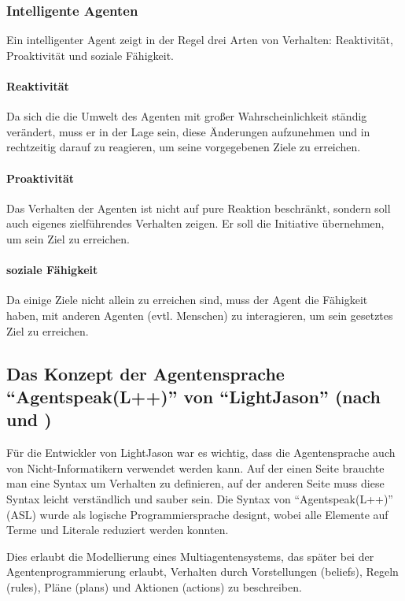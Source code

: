\subsubsection{Intelligente Agenten}

Ein intelligenter Agent zeigt in der Regel drei Arten von Verhalten: Reaktivität, Proaktivität und soziale Fähigkeit.

\paragraph*{Reaktivität} 
Da sich die die Umwelt des Agenten  mit großer Wahrscheinlichkeit ständig verändert, muss er in der Lage sein, diese Änderungen aufzunehmen und in rechtzeitig darauf zu reagieren, um seine vorgegebenen Ziele zu erreichen.

\paragraph*{Proaktivität} 
Das Verhalten der Agenten ist nicht auf pure Reaktion beschränkt, sondern soll auch eigenes zielführendes Verhalten zeigen. 
Er soll die Initiative übernehmen, um sein Ziel zu erreichen.

\paragraph*{soziale Fähigkeit} 
Da einige Ziele nicht allein zu erreichen sind, muss der Agent die Fähigkeit haben, mit anderen Agenten (evtl. Menschen) zu interagieren, um sein gesetztes Ziel zu erreichen.


\subsection{Das Konzept der Agentensprache \enquote{Agentspeak(L++)} von \enquote{LightJason} (nach \cite{lightjason} und \cite{lightjason-web})}
\label{sec:agentspeak}

Für die Entwickler von LightJason war es wichtig, dass die Agentensprache auch von Nicht-Informatikern verwendet werden kann.
Auf der einen Seite brauchte man eine Syntax um Verhalten zu definieren, auf der anderen Seite muss diese Syntax leicht verständlich und sauber sein.
Die Syntax von \enquote{Agentspeak(L++)} (ASL) wurde als logische Programmiersprache designt, wobei alle Elemente auf Terme und Literale reduziert werden konnten.

Dies erlaubt die Modellierung eines Multiagentensystems, das später bei der Agentenprogrammierung erlaubt, Verhalten durch Vorstellungen (beliefs), Regeln (rules), Pläne (plans) und Aktionen (actions) zu beschreiben.

